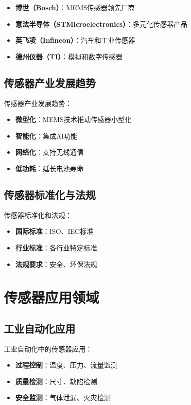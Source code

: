 \documentclass[12pt,UTF8]{ctexbook}
\begin{document}
\begin{itemize}[leftmargin=2cm]
	\item \textbf{博世（Bosch）}：MEMS传感器领先厂商
	\item \textbf{意法半导体（STMicroelectronics）}：多元化传感器产品
	\item \textbf{英飞凌（Infineon）}：汽车和工业传感器
	\item \textbf{德州仪器（TI）}：模拟和数字传感器
\end{itemize}

\section{传感器产业发展趋势}

传感器产业发展趋势：

\begin{itemize}[leftmargin=2cm]
	\item \textbf{微型化}：MEMS技术推动传感器小型化
	\item \textbf{智能化}：集成AI功能
	\item \textbf{网络化}：支持无线通信
	\item \textbf{低功耗}：延长电池寿命
\end{itemize}

\section{传感器标准化与法规}

传感器标准化和法规：

\begin{itemize}[leftmargin=2cm]
	\item \textbf{国际标准}：ISO、IEC标准
	\item \textbf{行业标准}：各行业特定标准
	\item \textbf{法规要求}：安全、环保法规
\end{itemize}

\chapter{传感器应用领域}

\section{工业自动化应用}

工业自动化中的传感器应用：

\begin{itemize}[leftmargin=2cm]
	\item \textbf{过程控制}：温度、压力、流量监测
	\item \textbf{质量检测}：尺寸、缺陷检测
	\item \textbf{安全监测}：气体泄漏、火灾检测
\end{itemize}
\end{document}
